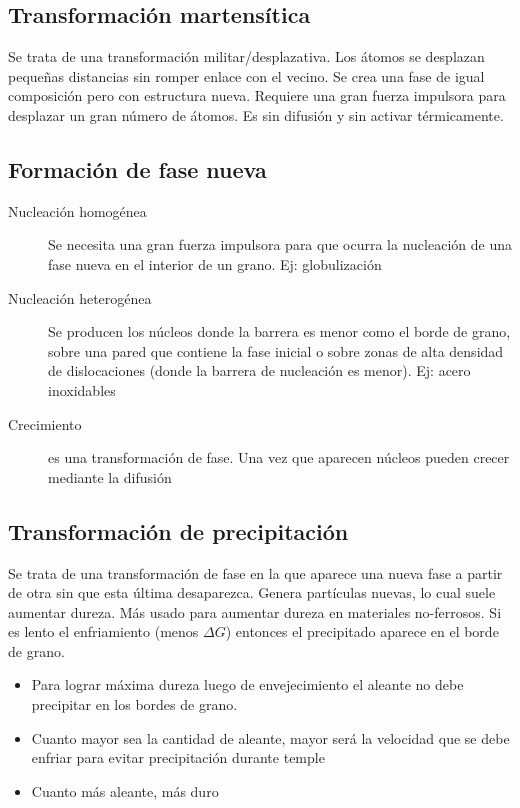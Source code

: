 \subsection{Transformación martensítica}

Se trata de una transformación militar/desplazativa. Los átomos se desplazan pequeñas distancias sin romper enlace con el vecino. Se crea una fase de igual composición pero con estructura nueva. Requiere una gran fuerza impulsora para desplazar un gran número de átomos. Es sin difusión y sin activar térmicamente. 


\subsection{Formación de fase nueva}

\begin{description}
	\item[Nucleación homogénea] Se necesita una gran fuerza impulsora para que ocurra la nucleación de una fase nueva en el interior de un grano. Ej: globulización
	\item[Nucleación heterogénea] Se producen los núcleos donde la barrera es menor como el borde de grano, sobre una pared que contiene la fase inicial o sobre zonas de alta densidad de dislocaciones (donde la barrera de nucleación es menor). Ej: acero inoxidables
	\item[Crecimiento] es una transformación de fase. Una vez que aparecen núcleos pueden crecer mediante la difusión 
\end{description}


\subsection{Transformación de precipitación}

Se trata de una transformación de fase en la que aparece una nueva fase a partir de otra sin que esta última desaparezca. Genera partículas nuevas, lo cual suele aumentar dureza. Más usado para aumentar dureza en materiales no-ferrosos. Si es lento el enfriamiento (menos $\Delta G$) entonces el precipitado aparece en el borde de grano.

\begin{itemize}
	\item Para lograr máxima dureza luego de envejecimiento el aleante no debe precipitar en los bordes de grano.
	\item Cuanto mayor sea la cantidad de aleante, mayor será la velocidad que se debe enfriar para evitar precipitación durante temple
	\item Cuanto más aleante, más duro
\end{itemize}

